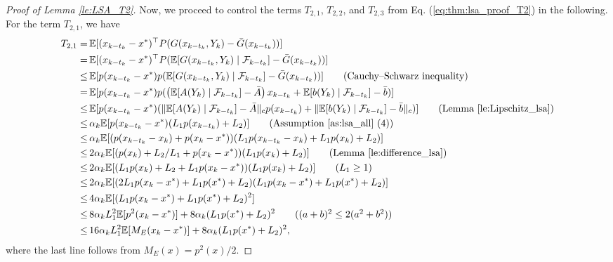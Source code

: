 \documentclass[11 pt]{article}
\begin{document}
\begin{proof}[Proof of Lemma \ref{le:LSA_T2}]
		
		Now, we proceed to control the terms $T_{2,1}$, $T_{2,2}$, and $T_{2,3}$ from Eq. (\ref{eq:thm:lsa_proof_T2}) in the following. For the term $T_{2,1}$, we have
		\begin{align*}
			T_{2,1}=\,&\mathbb{E}[(x_{k-t_k}-x^*)^\top P (G(x_{k-t_k},Y_k)-\bar{G}(x_{k-t_k}))]\\
			=\,&\mathbb{E}[(x_{k-t_k}-x^*)^\top P (\mathbb{E}[G(x_{k-t_k},Y_k)\mid \mathcal{F}_{k-t_k}]-\bar{G}(x_{k-t_k}))]\\
			\leq \,&\mathbb{E}[p(x_{k-t_k}-x^*) p(\mathbb{E}[G(x_{k-t_k},Y_k)\mid \mathcal{F}_{k-t_k}]-\bar{G}(x_{k-t_k}))]\tag{Cauchy–Schwarz inequality}\\
			= \,&\mathbb{E}[p(x_{k-t_k}-x^*) p(\left(\mathbb{E}[A(Y_k)\mid \mathcal{F}_{k-t_k}]-\bar{A}\right)x_{k-t_k}+\mathbb{E}[b(Y_k)\mid \mathcal{F}_{k-t_k}]-\bar{b})]\\
			\leq \,&\mathbb{E}[p(x_{k-t_k}-x^*) (\|\mathbb{E}[A(Y_k)\mid \mathcal{F}_{k-t_k}]-\bar{A}\|_cp(x_{k-t_k})+\|\mathbb{E}[b(Y_k)\mid \mathcal{F}_{k-t_k}]-\bar{b}\|_c)]\tag{Lemma \ref{le:Lipschitz_lsa}}\\
			\leq \,&\alpha_k\mathbb{E}[p(x_{k-t_k}-x^*) (L_1p(x_{k-t_k})+L_2)]\tag{Assumption \ref{as:lsa_all} (4)}\\
			\leq \,&\alpha_k\mathbb{E}[(p(x_{k-t_k}-x_k)+p(x_k-x^*)) (L_1p(x_{k-t_k}-x_k)+L_1p(x_k)+L_2)]\\
			\leq \,&2\alpha_k\mathbb{E}[(p(x_k)+L_2/L_1+p(x_k-x^*)) (L_1p(x_k)+L_2)]\tag{Lemma \ref{le:difference_lsa}}\\
			\leq \,&2\alpha_k\mathbb{E}[(L_1p(x_k)+L_2+L_1p(x_k-x^*)) (L_1p(x_k)+L_2)]\tag{$L_1\geq 1$}\\
			\leq \,&2\alpha_k\mathbb{E}[(2L_1p(x_k-x^*)+L_1p(x^*)+L_2) (L_1p(x_k-x^*)+L_1p(x^*)+L_2)]\\
			\leq \,&4\alpha_k\mathbb{E}[(L_1p(x_k-x^*)+L_1p(x^*)+L_2)^2]\\
			\leq \,&8\alpha_kL_1^2\mathbb{E}[p^2(x_k-x^*)]+8\alpha_k(L_1p(x^*)+L_2)^2\tag{$(a+b)^2\leq 2(a^2+b^2)$}\\
			\leq \,&16\alpha_kL_1^2\mathbb{E}[M_E(x_k-x^*)]+8\alpha_k(L_1p(x^*)+L_2)^2,
		\end{align*}
		where the last line follows from $M_E(x)=p^2(x)/2$. 
		

\end{proof}
\end{document}
